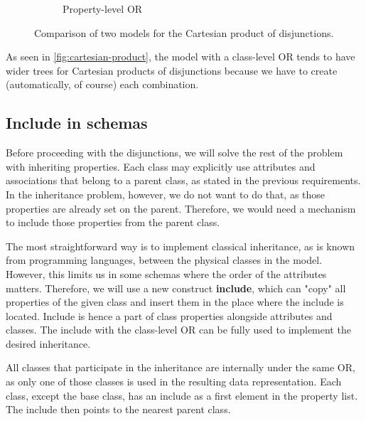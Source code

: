 \begin{figure}[h!]
\begin{subfigure}[b]{.4\textwidth}
    \caption{Property-level OR}
    \label{fig:cartesian-product:property-or}
    \end{subfigure}%
  \caption{Comparison of two models for the Cartesian product of disjunctions.}
  \label{fig:cartesian-product}
\end{figure}

As seen in \autoref{fig:cartesian-product}, the model with a class-level OR tends to have wider trees for Cartesian products of disjunctions because we have to create (automatically, of course) each combination.

\subsection{Include in schemas}

Before proceeding with the disjunctions, we will solve the rest of the problem with inheriting properties. Each class may explicitly use attributes and associations that belong to a parent class, as stated in the previous requirements. In the inheritance problem, however, we do not want to do that, as those properties are already set on the parent. Therefore, we would need a mechanism to include those properties from the parent class.

The most straightforward way is to implement classical inheritance, as is known from programming languages, between the physical classes in the model. However, this limits us in some schemas where the order of the attributes matters. Therefore, we will use a new construct \textbf{include}, which can "copy" all properties of the given class and insert them in the place where the include is located. Include is hence a part of class properties alongside attributes and classes. The include with the class-level OR can be fully used to implement the desired inheritance.

All classes that participate in the inheritance are internally under the same OR, as only one of those classes is used in the resulting data representation. Each class, except the base class, has an include as a first element in the property list. The include then points to the nearest parent class.

